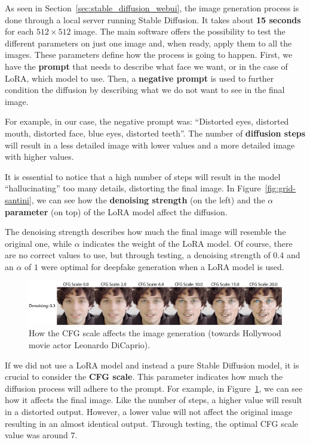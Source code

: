 \documentclass[preprint]{elsarticle}
\begin{document}
As seen in Section~\ref{sec:stable_diffusion_webui}, the image generation process is done through 
a local server running Stable Diffusion.  It takes about \textbf{15 seconds} for each $512 \times 512$ image.  The main software offers the possibility to test the different parameters  on just one image and, when ready, apply them to all the images.  These parameters define how the process is going to happen.
First, we have the \textbf{prompt} that needs to describe what face we want, or in the case of LoRA, 
which model to use.
Then, a \textbf{negative prompt} is used to further condition the diffusion by  describing what we do not want to see in the final image. 

For example, in our case, the negative prompt was: ``Distorted eyes, distorted mouth, distorted face, blue eyes, distorted teeth''. The number of \textbf{diffusion steps} will result in a less detailed image with lower values and  a more detailed image with higher values. 

It is essential to notice that a high number of steps will result in the model ``hallucinating'' too many details, distorting the final image. In Figure~\ref{fig:grid-santini}, we can see how the \textbf{denoising strength} (on the left) and the \textbf{$\alpha$ parameter} (on top) of the LoRA model affect the diffusion. 

The denoising strength describes how much the final image will resemble the original one, while $\alpha$ indicates the weight of the LoRA model. Of course, there are no correct values to use, but through testing, a denoising strength of $0.4$ and an $\alpha$ of $1$ were optimal for deepfake generation when a LoRA model is used. 

\begin{figure}[t]
	\centering
	\includegraphics[width=\textwidth, keepaspectratio]{img/project_img/cfg-examples.png}
	\caption{How the CFG scale affects the image generation (towards Hollywood movie actor Leonardo DiCaprio).}
	\label{fig:cfg-examples}
\end{figure}

If we did not use a LoRA model and instead a pure Stable Diffusion model, 
it is crucial to consider the \textbf{CFG scale}. 
This parameter indicates how much the diffusion process will adhere to the prompt.  For example, in Figure~\ref{fig:cfg-examples}, we can see how it affects the final image.  Like the number of steps, a higher value will result in a distorted output. However, a lower value will not affect the original image resulting in an almost identical output. Through testing, the optimal CFG scale value was around $7$.
\end{document}
